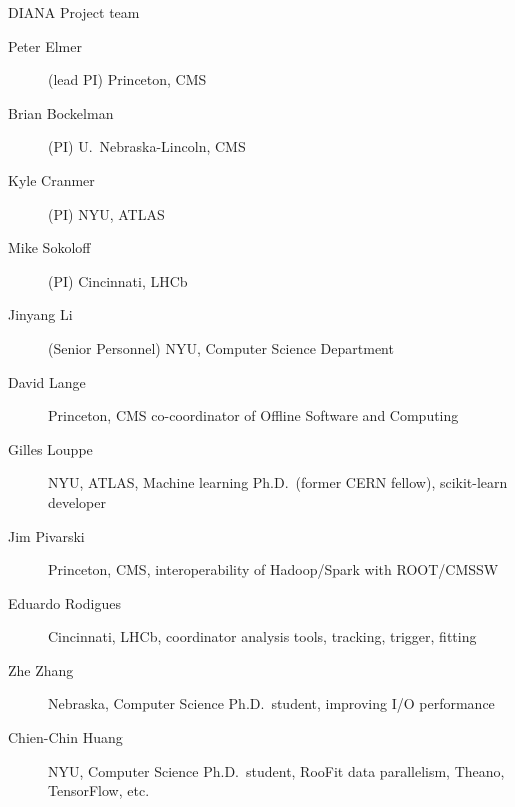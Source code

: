 \documentclass{beamer}
\begin{document}
\begin{frame}{DIANA Project team}
\scriptsize
\begin{description}
\item[Peter Elmer] (lead PI) Princeton, CMS
\item[Brian Bockelman] (PI) U.\ Nebraska-Lincoln, CMS
\item[Kyle Cranmer] (PI) NYU, ATLAS
\item[Mike Sokoloff] (PI) Cincinnati, LHCb
\item[Jinyang Li] (Senior Personnel) NYU, Computer Science Department
\item[David Lange] Princeton, CMS co-coordinator of Offline Software and Computing
\item[Gilles Louppe] NYU, ATLAS, Machine learning Ph.D.\ (former CERN fellow), scikit-learn developer
\item[Jim Pivarski] Princeton, CMS, interoperability of Hadoop/Spark with ROOT/CMSSW
\item[Eduardo Rodigues] Cincinnati, LHCb, coordinator analysis tools, tracking, trigger, fitting
\item[Zhe Zhang] Nebraska, Computer Science Ph.D.\ student, improving I/O performance
\item[Chien-Chin Huang] NYU, Computer Science Ph.D.\ student, RooFit data parallelism, Theano, TensorFlow, etc.
\end{description}
\end{frame}
\end{document}
